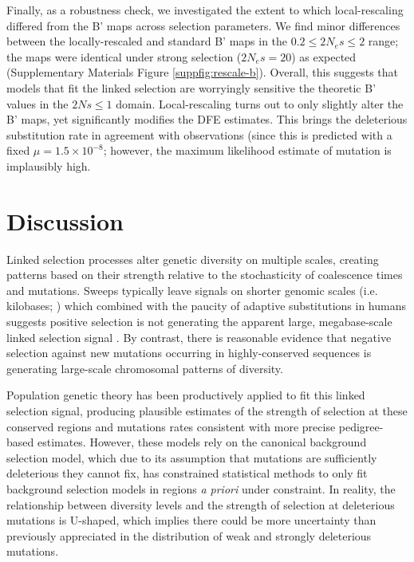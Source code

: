 \documentclass[11pt]{article}
\begin{document}
Finally, as a robustness check, we investigated the extent to which
local-rescaling differed from the B' maps across selection parameters. We find
minor differences between the locally-rescaled and standard B' maps in the $0.2
\le 2N_e s \le 2$ range; the maps were identical under strong selection ($2N_e
s= 20$) as expected (Supplementary Materials Figure \ref{suppfig:rescale-b}).
Overall, this suggests that models that fit the linked selection are worryingly
sensitive the theoretic B' values in the $2Ns \le 1$ domain. Local-rescaling
turns out to only slightly alter the B' maps, yet significantly modifies the
DFE estimates. This brings the deleterious substitution rate in agreement with
observations (since this is predicted with a fixed $\mu = 1.5 \times 10^{-8}$;
however, the maximum likelihood estimate of mutation is implausibly high.

\section*{Discussion}

Linked selection processes alter genetic diversity on multiple scales, creating
patterns based on their strength relative to the stochasticity of coalescence
times and mutations. Sweeps typically leave signals on shorter genomic scales
(i.e. kilobases; \cite{Akey2004-zg}) which combined with the paucity of
adaptive substitutions in humans suggests positive selection is not generating
the apparent large, megabase-scale linked selection signal
\parencite{Hernandez2011-gs,Murphy2022-sj}. By contrast, there is reasonable
evidence that negative selection against new mutations occurring in
highly-conserved sequences is generating large-scale chromosomal patterns of
diversity. 

Population genetic theory has been productively applied to fit this linked
selection signal, producing plausible estimates of the strength of selection at
these conserved regions and mutations rates consistent with more precise
pedigree-based estimates. However, these models rely on the canonical
background selection model, which due to its assumption that mutations are
sufficiently deleterious they cannot fix, has constrained statistical methods
to only fit background selection models in regions \emph{a priori} under
constraint. In reality, the relationship between diversity levels and the
strength of selection at deleterious mutations is U-shaped, which implies there
could be more uncertainty than previously appreciated in the distribution of
weak and strongly deleterious mutations.
\end{document}
